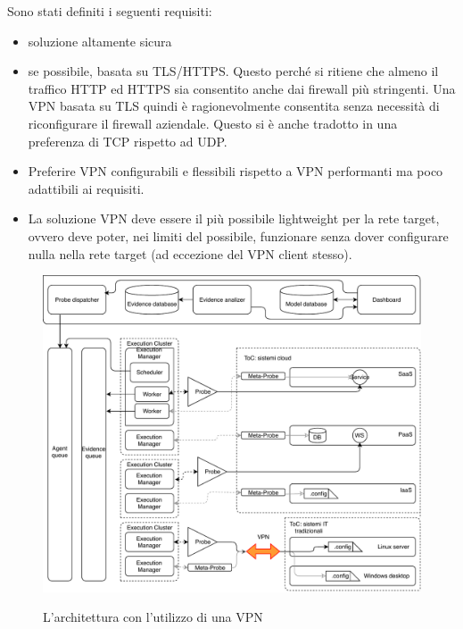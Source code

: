 Sono stati definiti i seguenti requisiti:
\begin{itemize}
    \item soluzione altamente sicura
    \item se possibile, basata su TLS/HTTPS. Questo perché si ritiene che
    almeno il traffico HTTP ed HTTPS sia consentito anche dai firewall
    più stringenti. Una VPN basata su TLS quindi è ragionevolmente consentita
    senza necessità di riconfigurare il firewall aziendale.
    Questo si è anche tradotto in una preferenza di TCP rispetto ad UDP.
    \item Preferire VPN configurabili e flessibili rispetto a
    VPN performanti ma poco adattibili ai requisiti.
    \item La soluzione VPN deve essere il più possibile lightweight
    per la rete target, ovvero deve poter, nei limiti del
    possibile, funzionare senza dover configurare nulla nella rete
    target (ad eccezione del VPN client stesso).
\end{itemize}

\begin{figure}
    \includegraphics[scale=0.6]{img/mooncloud_archi_extended}
    \label{fig:mooncloud-archi-extended}
    \caption[L'architettura con l'utilizzo di una VPN per
    consentire l'analisi di sistemi IT tradizionali]
    {L'architettura con l'utilizzo di una VPN}
\end{figure}
